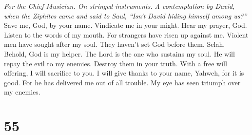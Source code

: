 \emph{For the Chief Musician. On stringed instruments. A contemplation
by David, when the Ziphites came and said to Saul, ``Isn't David hiding
himself among us?''}\\
 Save me, God, by your name. Vindicate me in your might.
 Hear my prayer, God. Listen to the words of my mouth.
 For strangers have risen up against me. Violent men have
sought after my soul. They haven't set God before them. Selah.
 Behold, God is my helper. The Lord is the one who
sustains my soul.  He will repay the evil to my enemies.
Destroy them in your truth.  With a free will offering, I
will sacrifice to you. I will give thanks to your name, Yahweh, for it
is good.  For he has delivered me out of all trouble. My
eye has seen triumph over my enemies.

\hypertarget{section-54}{%
\section{55}\label{section-54}}

